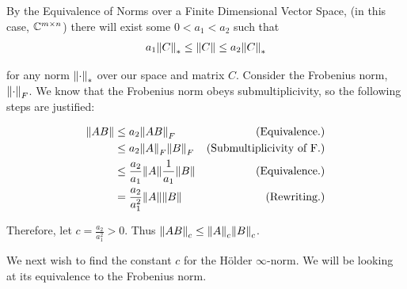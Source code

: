 \partbreak
\begin{solution}

    By the Equivalence of Norms over a Finite Dimensional Vector Space, (in this case, $\mathbb{C}^{m\times n}$) there will exist some $0< a_1 < a_2$ such that 
\vspace{-5mm}
\begin{align}
     a_1\norm{C}_* \leq \norm{C} \leq a_2\norm{C}_* \label{p3a: equiv}
\end{align}

for any norm $\norm{\cdot}_*$ over our space and matrix $C$. Consider the Frobenius norm, $\norm{\cdot}_F$. We know that the Frobenius norm obeys submultiplicivity, so the following steps are justified:

\alignbreak
\begin{align}
    \norm{AB} &\leq a_2\norm{AB}_F   &\text{(Equivalence.)}\nonumber\\
    &\leq a_2\norm{A}_F\norm{B}_F    &\text{(Submultiplicivity of F.)}\nonumber\\
    &\leq \frac{a_2}{a_1}\norm{A}\frac{1}{a_1}\norm{B}  &\text{(Equivalence.)}\nonumber\\
    &= \frac{a_2}{a_1^2}\norm{A}\norm{B}    &\text{(Rewriting.)}\nonumber
\end{align}
\alignbreak

Therefore, let $c = \frac{a_2}{a_1^2} > 0$. Thus $\norm{AB}_c \leq \norm{A}_c\norm{B}_c$.


\jump
We next wish to find the constant $c$ for the H\"{o}lder $\infty$-norm. We will be looking at its equivalence to the Frobenius norm. 


\end{solution}
